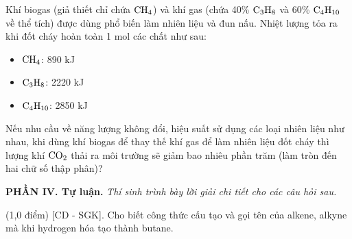 \documentclass[12pt,a4paper]{article}
\begin{document}
\begin{ex}
Khí biogas (giả thiết chỉ chứa $\ce{CH4}$) và khí gas (chứa 40\% $\ce{C3H8}$ và 60\% $\ce{C4H10}$ về thể tích) được dùng phổ biến làm nhiên liệu và đun nấu. Nhiệt lượng tỏa ra khi đốt cháy hoàn toàn 1 mol các chất như sau:
\begin{itemize}
    \setlength\itemsep{0pt}
    \item $\ce{CH4}$: 890 kJ
    \item $\ce{C3H8}$: 2220 kJ
    \item $\ce{C4H10}$: 2850 kJ
\end{itemize}
Nếu nhu cầu về năng lượng không đổi, hiệu suất sử dụng các loại nhiên liệu như nhau, khi dùng khí biogas để thay thế khí gas để làm nhiên liệu đốt cháy thì lượng khí $\ce{CO2}$ thải ra môi trường sẽ giảm bao nhiêu phần trăm (làm tròn đến hai chữ số thập phân)?
\end{ex}

\vspace{0.3cm}
\noindent\textbf{\large PHẦN IV. Tự luận.}
\textit{Thí sinh trình bày lời giải chi tiết cho các câu hỏi sau.}
\vspace{0.2cm}

\begin{ex}
(1,0 điểm) [CD - SGK]. Cho biết công thức cấu tạo và gọi tên của alkene, alkyne mà khi hydrogen hóa tạo thành butane.

\vspace{4.0cm}

\end{ex}
\end{document}
